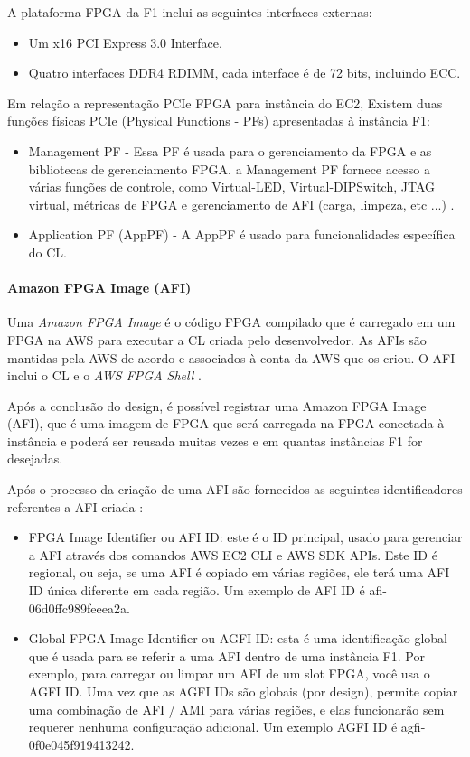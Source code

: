 A plataforma FPGA da F1 inclui as seguintes interfaces externas:

\begin{itemize}
    \item Um x16 PCI Express 3.0 Interface.
    \item 
Quatro interfaces DDR4 RDIMM, cada interface é de 72 bits, incluindo ECC.
\end{itemize}
 
Em relação a representação PCIe FPGA para instância do EC2, Existem duas funções físicas PCIe (Physical Functions - PFs) apresentadas à instância F1:

\begin{itemize}
    \item Management PF - Essa PF é usada para o gerenciamento da FPGA e as bibliotecas de gerenciamento FPGA. a Management PF fornece acesso a várias funções de controle, como Virtual-LED, Virtual-DIPSwitch, JTAG virtual, métricas de FPGA e gerenciamento de AFI (carga, limpeza, etc ...) \cite{awsshell}.
    
    \item Application PF (AppPF) - A AppPF é usado para funcionalidades específica do CL.
\end{itemize}

\paragraph{Amazon FPGA Image (AFI)} \label{sec:afi}
 
 Uma \textit{Amazon FPGA Image} é o código FPGA compilado que é carregado em um FPGA na AWS para executar a CL criada pelo desenvolvedor. As AFIs são mantidas pela AWS de acordo e associados à conta da AWS que os criou. O AFI inclui o CL e o \textit{AWS FPGA Shell} \cite{awsfaq}.
 
 Após a conclusão do design, é possível registrar uma Amazon FPGA Image (AFI), que é uma imagem de FPGA que será carregada na FPGA conectada à instância e poderá ser reusada muitas vezes e em quantas instâncias F1 for desejadas.  

Após o processo da criação de uma AFI são fornecidos as seguintes identificadores referentes a AFI criada :
\begin{itemize}

\item FPGA Image Identifier ou AFI ID: este é o ID principal, usado para gerenciar a AFI através dos comandos AWS EC2 CLI e AWS SDK APIs. Este ID é regional, ou seja, se uma AFI é copiado em várias regiões, ele terá uma  AFI ID única diferente em cada região. Um exemplo de AFI ID é afi-06d0ffc989feeea2a. 

\item Global FPGA Image Identifier ou AGFI ID: esta é uma identificação global que é usada para se referir a uma AFI dentro de uma instância F1. Por exemplo, para carregar ou limpar um AFI de um slot FPGA, você usa o AGFI ID. Uma vez que as  AGFI  IDs são globais (por design), permite copiar uma combinação de AFI / AMI para várias regiões, e elas funcionarão sem requerer nenhuma configuração adicional. Um exemplo AGFI ID é agfi-0f0e045f919413242.

\end{itemize}


